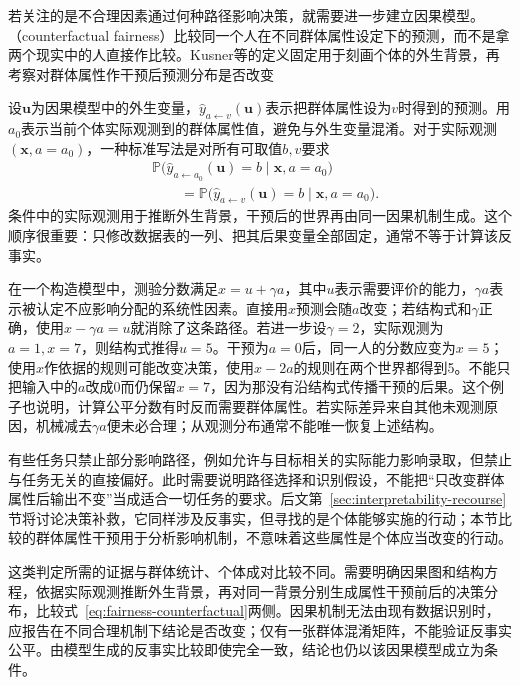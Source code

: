 若关注的是不合理因素通过何种路径影响决策，就需要进一步建立因果模型。（counterfactual fairness）比较同一个人在不同群体属性设定下的预测，而不是拿两个现实中的人直接作比较。Kusner等的定义固定用于刻画个体的外生背景，再考察对群体属性作干预后预测分布是否改变

设$\bm{u}$为因果模型中的外生变量，$\hat y_{a\leftarrow v}(\bm{u})$表示把群体属性设为$v$时得到的预测。用$a_0$表示当前个体实际观测到的群体属性值，避免与外生变量混淆。对于实际观测$(\bm{x},a=a_0)$，一种标准写法是对所有可取值$b,v$要求
\begin{equation}
\begin{aligned}
 &\mathbb P\bigl(\hat y_{a\leftarrow a_0}(\bm{u})=b
       \mid\bm{x},a=a_0\bigr)\\
 &\qquad=\mathbb P\bigl(\hat y_{a\leftarrow v}(\bm{u})=b
       \mid\bm{x},a=a_0\bigr).
\end{aligned}
 \label{eq:fairness-counterfactual}
\end{equation}
条件中的实际观测用于推断外生背景，干预后的世界再由同一因果机制生成。这个顺序很重要：只修改数据表的一列、把其后果变量全部固定，通常不等于计算该反事实。

在一个构造模型中，测验分数满足$x=u+\gamma a$，其中$u$表示需要评价的能力，$\gamma a$表示被认定不应影响分配的系统性因素。直接用$x$预测会随$a$改变；若结构式和$\gamma$正确，使用$x-\gamma a=u$就消除了这条路径。若进一步设$\gamma=2$，实际观测为$a=1,x=7$，则结构式推得$u=5$。干预为$a=0$后，同一人的分数应变为$x=5$；使用$x$作依据的规则可能改变决策，使用$x-2a$的规则在两个世界都得到5。不能只把输入中的$a$改成0而仍保留$x=7$，因为那没有沿结构式传播干预的后果。这个例子也说明，计算公平分数有时反而需要群体属性。若实际差异来自其他未观测原因，机械减去$\gamma a$便未必合理；从观测分布通常不能唯一恢复上述结构。

有些任务只禁止部分影响路径，例如允许与目标相关的实际能力影响录取，但禁止与任务无关的直接偏好。此时需要说明路径选择和识别假设，不能把“只改变群体属性后输出不变”当成适合一切任务的要求。后文第~\ref{sec:interpretability-recourse}节将讨论决策补救，它同样涉及反事实，但寻找的是个体能够实施的行动；本节比较的群体属性干预用于分析影响机制，不意味着这些属性是个体应当改变的行动。

这类判定所需的证据与群体统计、个体成对比较不同。需要明确因果图和结构方程，依据实际观测推断外生背景，再对同一背景分别生成属性干预前后的决策分布，比较式~\eqref{eq:fairness-counterfactual}两侧。因果机制无法由现有数据识别时，应报告在不同合理机制下结论是否改变；仅有一张群体混淆矩阵，不能验证反事实公平。由模型生成的反事实比较即使完全一致，结论也仍以该因果模型成立为条件。

